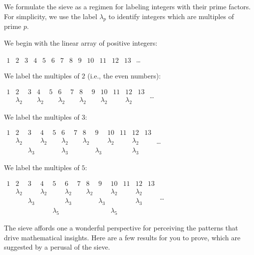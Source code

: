 \begin{itemize}
\begin{itemize}
We formulate the sieve as a regimen for labeling integers with their prime factors.  For simplicity, we use the label $\lambda_p$ to identify integers which are multiples of prime $p$.

\medskip

We begin with the linear array of positive integers:

$\begin{array}{c|c|c|c|c|c|c|c|c|c|c|c|c}
1 & 2 & 3 & 4 & 5 & 6 & 7 & 8 & 9 & 10 & 11 & 12 & 13
\end{array}$ \ldots

\medskip

We label the multiples of $2$ (i.e., the even numbers):

$\begin{array}{c|c|c|c|c|c|c|c|c|c|c|c|c}
1 & 2 & 3 & 4 & 5 & 6 & 7 & 8 & 9 & 10 & 11 & 12 & 13 \\
 & \lambda_2 & & \lambda_2 & & \lambda_2 & & \lambda_2 & & \lambda_2 & & \lambda_2 &
\end{array}$ \ldots

\medskip

We label the multiples of $3$:

$\begin{array}{c|c|c|c|c|c|c|c|c|c|c|c|c}
1 & 2 & 3 & 4 & 5 & 6 & 7 & 8 & 9 & 10 & 11 & 12 & 13 \\
 & \lambda_2 & & \lambda_2 & & \lambda_2 & & \lambda_2 & & \lambda_2 & & \lambda_2 & \\
 & & \lambda_3 & &  & \lambda_3 & & & \lambda_3 & & & \lambda_3 &
\end{array}$ \ldots

\medskip

We label the multiples of $5$:

$\begin{array}{c|c|c|c|c|c|c|c|c|c|c|c|c}
1 & 2 & 3 & 4 & 5 & 6 & 7 & 8 & 9 & 10 & 11 & 12 & 13 \\
 & \lambda_2 & & \lambda_2 & & \lambda_2 & & \lambda_2 & & \lambda_2 & & \lambda_2 & \\
 & & \lambda_3 & &  & \lambda_3 & & & \lambda_3 & & & \lambda_3 & \\
 & & & & \lambda_5 & & & & & \lambda_5 & & & 
\end{array}$ \ldots

\bigskip

The sieve affords one a wonderful perspective for perceiving the patterns that drive mathematical insights.  Here are a few results for you to prove, which are suggested by a perusal of the sieve.


\end{itemize}
\end{itemize}
